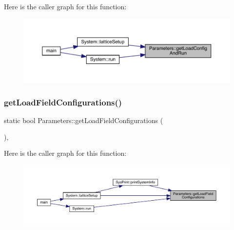 Here is the caller graph for this function\+:\nopagebreak
\begin{figure}[H]
\begin{center}
\leavevmode
\includegraphics[width=350pt]{class_parameters_a7870fae41b172caee9fa020c86d056ac_icgraph}
\end{center}
\end{figure}
\mbox{\label{class_parameters_a5a11841ee32f68ebd27a8146a3fda07b}} 
\subsubsection{\texorpdfstring{getLoadFieldConfigurations()}{getLoadFieldConfigurations()}}
{\footnotesize\ttfamily static bool Parameters\+::get\+Load\+Field\+Configurations (\begin{DoxyParamCaption}{ }\end{DoxyParamCaption})\hspace{0.3cm}{\ttfamily [inline]}, {\ttfamily [static]}}

Here is the caller graph for this function\+:\nopagebreak
\begin{figure}[H]
\begin{center}
\leavevmode
\includegraphics[width=350pt]{class_parameters_a5a11841ee32f68ebd27a8146a3fda07b_icgraph}
\end{center}
\end{figure}
\mbox{\label{class_parameters_ae63389dad9d4564f4849137d2ab37df5}} 
